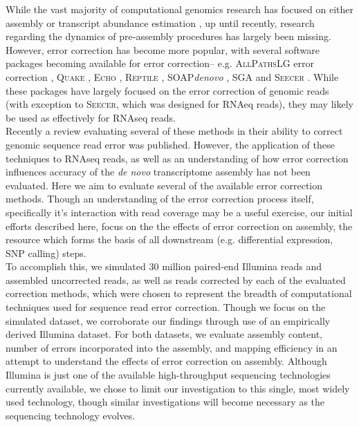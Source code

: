 \documentclass[11pt]{article}
\begin{document}
\noindent
While the vast majority of computational genomics research has focused on either assembly \citep{Chaisson:2004kf,Miller:2010gxa,Earl:2011gt,Bradnam:2013uu} or transcript abundance estimation \citep{Soneson:2013fr,Marioni:2008bg,Mortazavi:2008jj,Pyrkosz:2013tm}, up until recently, research regarding the dynamics of pre-assembly procedures has largely been missing. However, error correction has become more popular, with several software packages becoming available for error correction-- e.g.  \textsc{AllPathsLG} error correction \citep{Gnerre:2011fd}, \textsc{Quake} \citep{Kelley:2010kg}, \textsc{Echo} \citep{Kao:2011bx}, \textsc{Reptile} \citep{Yang:2010kv}, SOAP\textit{denovo} \citep{Liu:2011ez}, \textsc{SGA} \citep{Simpson:2010fd} and \textsc{Seecer} \citep{Le:2013dy}.  While these packages have largely focused on the error correction of genomic reads (with exception to \textsc{Seecer}, which was designed for RNAeq reads), they may likely be used as effectively for RNAseq reads.  \\ 

\noindent
Recently a review \citep{Yang:2013ck} evaluating several of these methods in their ability to correct genomic sequence read error was published. However, the application of these techniques to RNAseq reads, as well as an understanding of how error correction influences accuracy of the \textit{de novo} transcriptome assembly has not been evaluated. Here we aim to evaluate several of the available error correction methods. Though an understanding of the error correction process itself, specifically it's interaction with read coverage may be a useful exercise, our initial efforts described here, focus on the the effects of error correction on assembly, the resource which forms the basis of all downstream (e.g. differential expression, SNP calling) steps.  \\

\noindent
To accomplish this, we simulated 30 million paired-end Illumina reads and assembled uncorrected reads, as well as reads corrected by each of the evaluated correction methods, which were chosen to represent the breadth of computational techniques used for sequence read error correction.  Though we focus on the simulated dataset, we corroborate our findings through use of an empirically derived Illumina dataset.  For both datasets, we evaluate assembly content, number of errors incorporated into the assembly, and mapping efficiency in an attempt to understand the effects of error correction on assembly. Although Illumina is just one of the available high-throughput sequencing technologies currently available, we chose to limit our investigation to this single, most widely used technology, though similar investigations will become necessary as the sequencing technology evolves. \\
\end{document}
